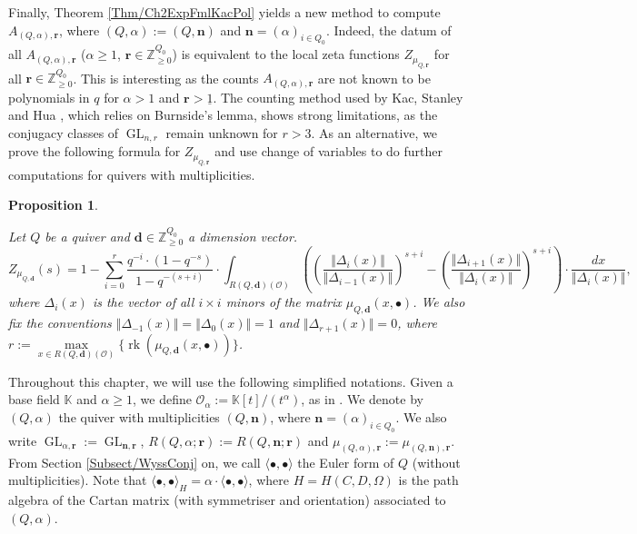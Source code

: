 \documentclass[11pt,english]{article}
\numberwithin{equation}{section}
\numberwithin{figure}{section}
\theoremstyle{definition}
\theoremstyle{plain}
\newtheorem{prop}[df]{Proposition}
\theoremstyle{remark}
\DeclareMathOperator{\GL}{GL}
\DeclareMathOperator{\rk}{rk}
\newcommand\dd{\mathbf{d}}
\newcommand\nn{\mathbf{n}}
\newcommand\rr{\mathbf{r}}
\newcommand\ZZ{\mathbb{Z}}
\newcommand\KK{\mathbb{K}}
\begin{document}
Finally, Theorem \ref{Thm/Ch2ExpFmlKacPol} yields a new method to
compute $A_{(Q,\alpha),\rr}$, where $(Q,\alpha):=(Q,\nn)$ and $\nn=(\alpha)_{i\in Q_{0}}$.
Indeed, the datum of all $A_{(Q,\alpha),\rr}$ ($\alpha\geq1$, $\rr\in\ZZ_{\geq0}^{Q_{0}}$)
is equivalent to the local zeta functions $Z_{\mu_{Q,\rr}}$ for all
$\rr\in\ZZ_{\geq0}^{Q_{0}}$. This is interesting as the counts $A_{(Q,\alpha),\rr}$
are not known to be polynomials in $q$ for $\alpha>1$ and $\rr>\underline{1}$.
The counting method used by Kac, Stanley and Hua \cite{Kac83,Hua00},
which relies on Burnside's lemma, shows strong limitations, as the
conjugacy classes of $\GL_{n,r}$ remain unknown for $r>3$. As an
alternative, we prove the following formula for $Z_{\mu_{Q,\rr}}$
and use change of variables to do further computations for quivers
with multiplicities.

\begin{prop} \label{Prop/Ch2ZetaMomMap}

Let $Q$ be a quiver and $\dd\in\ZZ_{\geq0}^{Q_{0}}$ a dimension
vector.\[
Z_{\mu_{Q,\dd}}(s) = 
1-\sum_{i=0}^{r}\frac{q^{-i}\cdot(1-q^{-s})}{1-q^{-(s+i)}}\cdot \int_{R(Q,\dd)(\mathcal{O})} \left(\left(\frac{\Vert\Delta_{i}(x)\Vert}{\Vert\Delta_{i-1}(x)\Vert}\right)^{s+i}-\left(\frac{\Vert\Delta_{i+1}(x)\Vert}{\Vert\Delta_{i}(x)\Vert}\right)^{s+i} \right)\cdot\frac{dx}{\Vert\Delta_{i}(x)\Vert},
\]where $\Delta_{i}(x)$ is the vector of all $i\times i$ minors of
the matrix $\mu_{Q,\dd}(x,\bullet)$. We also fix the conventions
$\Vert\Delta_{-1}(x)\Vert=\Vert\Delta_{0}(x)\Vert=1$ and $\Vert\Delta_{r+1}(x)\Vert=0$,
where $r:=\underset{x\in R(Q,\dd)(\mathcal{O})}{\max}\{\rk(\mu_{Q,\dd}(x,\bullet))\}$.

\end{prop}

Throughout this chapter, we will use the following simplified notations.
Given a base field $\KK$ and $\alpha\geq1$, we define $\mathcal{O}_{\alpha}:=\KK[t]/(t^{\alpha})$,
as in \cite{Wys17b}. We denote by $(Q,\alpha)$ the quiver with multiplicities
$(Q,\nn)$, where $\nn=(\alpha)_{i\in Q_{0}}$. We also write $\GL_{\alpha,\rr}:=\GL_{\nn,\rr}$,
$R(Q,\alpha;\rr):=R(Q,\nn;\rr)$ and $\mu_{(Q,\alpha),\rr}:=\mu_{(Q,\nn),\rr}$.
From Section \ref{Subsect/WyssConj} on, we call $\langle\bullet,\bullet\rangle$
the Euler form of $Q$ (without multiplicities). Note that $\langle\bullet,\bullet\rangle_{H}=\alpha\cdot\langle\bullet,\bullet\rangle$,
where $H=H(C,D,\Omega)$ is the path algebra of the Cartan matrix
(with symmetriser and orientation) associated to $(Q,\alpha)$. 
\end{document}
